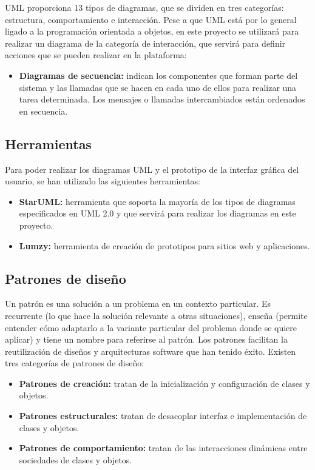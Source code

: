 UML proporciona 13 tipos de diagramas, que se dividen en tres categorías: estructura, comportamiento e interacción. Pese a que UML está por lo general ligado a la programación orientada a objetos, en este proyecto se utilizará para realizar un diagrama de la categoría de interacción, que servirá para definir acciones que se pueden realizar en la plataforma:

\noindent
\begin{itemize}
\item \textbf{Diagramas de secuencia:} indican los componentes que forman parte del sistema y las llamadas que se hacen en cada uno de ellos para realizar una tarea determinada. Los mensajes o llamadas intercambiados están ordenados en secuencia.
\end{itemize}

\subsection{Herramientas}
Para poder realizar los diagramas UML y el prototipo de la interfaz gráfica del usuario, se han utilizado las siguientes herramientas:

\begin{itemize}
\item \textbf{StarUML:} herramienta que soporta la mayoría de los tipos de diagramas especificados en UML 2.0 y que servirá para realizar los diagramas en este proyecto.
\item \textbf{Lumzy:} herramienta de creación de prototipos para sitios web y aplicaciones.
\end{itemize}

\subsection{Patrones de diseño}
Un patrón es una solución a un problema en un contexto particular. Es recurrente (lo que hace la solución relevante a otras situaciones), enseña (permite entender cómo adaptarlo a la variante particular del problema donde se quiere aplicar) y tiene un nombre para referirse al patrón. Los patrones facilitan la reutilización de diseños y arquitecturas software que han tenido éxito. Existen tres categorías de patrones de diseño:
\begin{itemize}
\item \textbf{Patrones de creación:} tratan de la inicialización y configuración de clases y objetos.
\item \textbf{Patrones estructurales:} tratan de desacoplar interfaz e implementación de clases y objetos.
\item \textbf{Patrones de comportamiento:} tratan de las interacciones dinámicas entre sociedades de clases y objetos.
\end{itemize}

